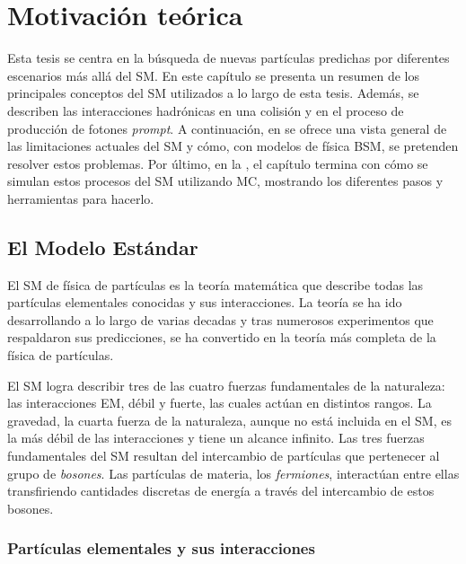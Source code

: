 \chapter{Motivación teórica}
\label{ch:theory}


Esta tesis se centra en la búsqueda de nuevas partículas predichas por diferentes escenarios más allá del \ac{SM}. En este capítulo se presenta un resumen de los principales conceptos del \ac{SM} utilizados a lo largo de esta tesis. Además, se describen las interacciones hadrónicas en una colisión \pp y en el proceso de producción de fotones \textit{prompt}.
A continuación, en \Sect{\ref{sec:theory:bsm}} se ofrece una vista general de las limitaciones actuales del \ac{SM} y cómo, con modelos de física \ac{BSM}, se pretenden resolver estos problemas.
Por último, en la \Sect{\ref{sec:theory:mc_simulation}}, el capítulo termina con cómo se simulan estos procesos del \ac{SM} utilizando \ac{MC}, mostrando los diferentes pasos y herramientas para hacerlo.




\section{El Modelo Estándar}
\label{sec:theory:sm}

El \acf{SM} de física de partículas es la teoría matemática que describe todas las partículas elementales conocidas y sus interacciones.
La teoría se ha ido desarrollando a lo largo de varias decadas y tras numerosos experimentos que respaldaron sus predicciones, se ha convertido en la teoría más completa de la física de partículas.

El \ac{SM} logra describir tres de las cuatro fuerzas fundamentales de la naturaleza: las interacciones \ac{EM}, débil y fuerte, las cuales actúan en distintos rangos.
La gravedad, la cuarta fuerza de la naturaleza, aunque no está incluida en el \ac{SM}, es la más débil de las interacciones y tiene un alcance infinito.
Las tres fuerzas fundamentales del \ac{SM} resultan del intercambio de partículas que pertenecer al grupo de \textit{bosones}. Las partículas de materia, los \textit{fermiones}, interactúan entre ellas transfiriendo cantidades discretas de energía a través del intercambio de estos bosones.



\subsection{Partículas elementales y sus interacciones}
\label{subsec:theory:sm:particles_interaction}

